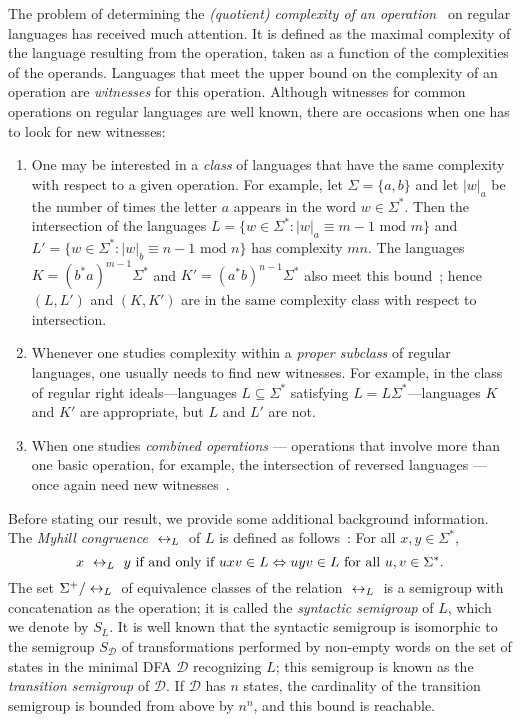 \documentclass{llncs}
\newcommand{\Sig}{\Sigma}
\newcommand{\be}{\begin{enumerate}}
\newcommand{\ee}{\end{enumerate}}
\newcommand{\cD}{{\mathcal D}}
\newcommand{\lraL}{{\hspace{.1cm}{\leftrightarrow_L} \hspace{.1cm}}}
\begin{document}
The problem of determining the \emph{(quotient) complexity of an operation}~\cite{Brz10,Mas70,Yu01,YZS94} on regular languages has received much attention. It is defined as the maximal complexity of the language resulting  from the operation, taken as a function of the complexities of the operands.
Languages that meet the upper bound on the complexity of an operation are \emph{witnesses} for this operation.
Although witnesses for common operations on regular languages are well known, there are occasions when one has to look for new witnesses:
\be
\item
One may be interested in  a \emph{class} of languages that have the same complexity with respect to a given operation. 
For example, let $\Sig=\{a,b\}$ and let $|w|_a$ be the number of times the letter $a$ appears in the word $w\in\Sig^*$.
Then the intersection of the languages $L=\{w\in\Sig^*\colon|w|_a\equiv m-1 \mbox{ mod } m\}$ and $L'=\{w\in\Sig^*\colon|w|_b\equiv n-1 \mbox{ mod } n\}$ has complexity $mn$. 
The languages $K=(b^*a)^{m-1}\Sig^*$ and $K'=(a^*b)^{n-1}\Sig^*$ also meet this bound~\cite{BJL13}; hence  $(L,L')$ and $(K,K')$  are in the same complexity class with respect to intersection.
\item
Whenever one studies complexity within a  \emph{proper subclass} of regular languages, one usually needs to find new witnesses.
For example, in the class of regular right ideals---languages $L\subseteq\Sig^* $ satisfying $L=L\Sig^*$---languages  $K$ and $K'$ are appropriate, but $L$ and $L'$ are not.
\item
When one studies \emph{combined operations} --- operations that involve more than one basic operation,  for example, the intersection of reversed languages --- once again need new witnesses~\cite{LMSY08}. 
\ee
Before stating our result, we provide some additional background information.
The \emph{Myhill congruence} $\lraL$ of $L$ is defined as follows~\cite{Myh57}: For all $x,y \in \Sig^*$, 
\begin{equation*}
x~\lraL~y \mbox{ if and only if } uxv\in L  \Leftrightarrow uyv\in L\mbox { for all } u,v\in\Sig^*.
\end{equation*}
The set $\Sig^+/ \lraL$ of equivalence classes of the relation $\lraL$ is a semigroup with concatenation as the operation; it is called the \emph{syntactic semigroup} of $L$, which we denote by $S_L$. 
It is well known that the syntactic semigroup is isomorphic to the semigroup $S_\cD$ of transformations performed by  non-empty words on the set of states in the minimal DFA $\cD$ recognizing $L$; this semigroup is known as the \emph{transition semigroup} of $\cD$.
If $\cD$ has $n$ states, the cardinality of the transition semigroup is bounded from above by $n^n$, and this bound is reachable.
\end{document}
